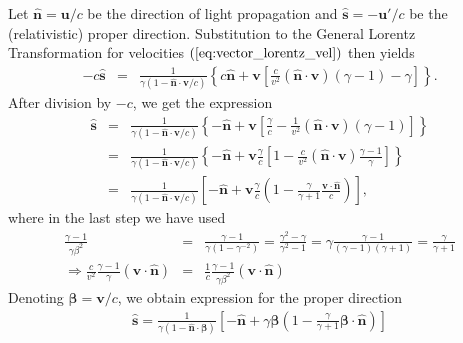\documentclass [12pt, a4paper] {article}
\newcommand{\vu}[1]
{
	\mathbf{\hat #1}
}
\newcommand{\vc}[1]
{
	\boldsymbol{#1}
}
\begin{document}
Let $\vu n= \vc u/c$ be the direction of light propagation and 
$\vu s = -\vc u'/c$ be the (relativistic) proper direction. Substitution to the
General Lorentz Transformation for velocities $(\ref{eq:vector_lorentz_vel})$ then 
yields 
\begin {eqnarray}
    -c\vu s 
    &=&
    \frac{1}{\gamma(1 - \vu n\cdot\vc v/c)}
    \left\{
        c\vu n
        +
        \vc v 
        \left[
             \frac{c}{v^2}(\vu n\cdot\vc v)\left(\gamma - 1\right) - \gamma
        \right]
    \right\}.
\end {eqnarray}
After division by $-c$, we get the expression
\begin {eqnarray}
    \vu s 
    &=&
    \frac{1}{\gamma(1 - \vu n\cdot\vc v/c)}
    \left\{
        -\vu n
        +
        \vc v 
        \left[
             \frac{\gamma}{c} - \frac{1}{v^2}(\vu n\cdot\vc v)\left(\gamma - 1\right)
        \right]
    \right\}
    \\
    &=&
    \frac{1}{\gamma(1 - \vu n\cdot\vc v/c)}
    \left\{
        -\vu n
        +
        \vc v 
        \frac{\gamma}{c}
        \left[
             1 - \frac{c}{v^2}(\vu n\cdot\vc v)\frac{\gamma - 1}{\gamma}
        \right]
    \right\}
    \\
    &=&
    \frac{1}{\gamma(1 - \vu n\cdot\vc v/c)}
    \left[
        -\vu n
        +
        \vc v 
        \frac{\gamma}{c}
        \left(
             1 - \frac{\gamma}{\gamma + 1}\frac{\vc v\cdot\vu n}{c}
        \right)
    \right], 
\end {eqnarray}
where in the last step we have used 
\begin{eqnarray}
    \frac{\gamma - 1}{\gamma\beta^2} 
    &=&
    \frac{\gamma - 1}{\gamma(1 - \gamma^{-2})}
    =
    \frac{\gamma^2 - \gamma}{\gamma^2 - 1}
    =
    \gamma\frac{\gamma - 1}{(\gamma - 1)(\gamma + 1)}
    = \frac{\gamma}{\gamma + 1}
    \\
    \Rightarrow
    \frac{c}{v^2}\frac{\gamma - 1}{\gamma}(\vc v\cdot\vu n)
    &=& \frac{1}{c}\frac{\gamma - 1}{\gamma\beta^2}(\vc v\cdot\vu n)
\end {eqnarray}
Denoting $\vc\beta=\vc v/c$, we obtain expression for the proper direction
\begin {eqnarray}
    \label{eq:properdir1}
    \vu s 
    =
    \frac{1}{\gamma(1 - \vu n\cdot\vc\beta)}
    \left[
        -\vu n 
        + 
        \gamma\vc\beta 
        \left(
            1 - \frac{\gamma}{\gamma + 1}\vc\beta\cdot\vu n
        \right)
    \right]
\end {eqnarray}
\end{document}
